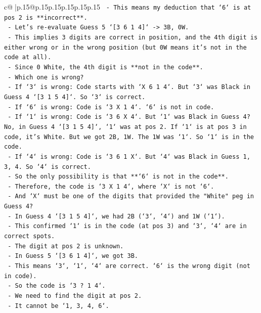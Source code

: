 \documentclass{article}
\begin{document}
{\begin{supertabular}{c@{$\;$}|p{.15\linewidth}@{}p{.15\linewidth}p{.15\linewidth}p{.15\linewidth}p{.15\linewidth}p{.15\linewidth}}
{{{\texttt{    {-} This means my deduction that `6` is at pos 2 is **incorrect**.} \\
\texttt{    {-} Let's re{-}evaluate Guess 5 `{[}3 6 1 4{]}` {-}> 3B, 0W.} \\
\texttt{    {-} This implies 3 digits are correct in position, and the 4th digit is either wrong or in the wrong position (but 0W means it's not in the code at all).} \\
\texttt{    {-} Since 0 White, the 4th digit is **not in the code**.} \\
\texttt{    {-} Which one is wrong?} \\
\texttt{        {-} If `3` is wrong: Code starts with `X 6 1 4`. But `3` was Black in Guess 4 `{[}3 1 5 4{]}`. So `3` is correct.} \\
\texttt{        {-} If `6` is wrong: Code is `3 X 1 4`. `6` is not in code.} \\
\texttt{        {-} If `1` is wrong: Code is `3 6 X 4`. But `1` was Black in Guess 4? No, in Guess 4 `{[}3 1 5 4{]}`, `1` was at pos 2. If `1` is at pos 3 in code, it's White. But we got 2B, 1W. The 1W was `1`. So `1` is in the code.} \\
\texttt{        {-} If `4` is wrong: Code is `3 6 1 X`. But `4` was Black in Guess 1, 3, 4. So `4` is correct.} \\
\texttt{    {-} So the only possibility is that **`6` is not in the code**.} \\
\texttt{    {-} Therefore, the code is `3 X 1 4`, where `X` is not `6`.} \\
\texttt{    {-} And `X` must be one of the digits that provided the "White" peg in Guess 4?} \\
\texttt{    {-} In Guess 4 `{[}3 1 5 4{]}`, we had 2B (`3`, `4`) and 1W (`1`).} \\
\texttt{    {-} This confirmed `1` is in the code (at pos 3) and `3`, `4` are in correct spots.} \\
\texttt{    {-} The digit at pos 2 is unknown.} \\
\texttt{    {-} In Guess 5 `{[}3 6 1 4{]}`, we got 3B.} \\
\texttt{    {-} This means `3`, `1`, `4` are correct. `6` is the wrong digit (not in code).} \\
\texttt{    {-} So the code is `3 ? 1 4`.} \\
\texttt{    {-} We need to find the digit at pos 2.} \\
\texttt{    {-} It cannot be `1, 3, 4, 6`.} \\
}}}
\end{supertabular}}
\end{document}

